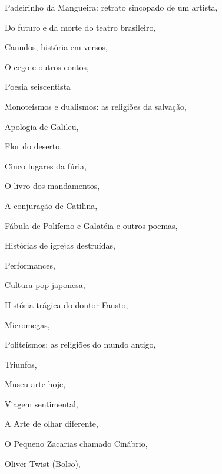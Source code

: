 \begin{multicols}{2}
\begin{enumerate}
{\item Padeirinho da Mangueira: retrato sincopado de um artista, {}
\item Do futuro e da morte do teatro brasileiro, {}
\item Canudos, história em versos, {}
\item O cego e outros contos, {}
\item Poesia seiscentista
\item Monoteísmos e dualismos: as religiões da salvação, {}
\item Apologia de Galileu, {}
\item Flor do deserto, {}
\item Cinco lugares da fúria, {}
\item O livro dos mandamentos, {}
\item A conjuração de Catilina, {}
\item Fábula de Polifemo e Galatéia e outros poemas, {}
\item Histórias de igrejas destruídas, {}
\item Performances, {}
\item Cultura pop japonesa, {}
\item História trágica do doutor Fausto, {}
\item Micromegas, {}
\item Politeísmos: as religiões do mundo antigo, {}
\item Triunfos, {}
\item Museu arte hoje, {}
\item Viagem sentimental, {}
\item A Arte de olhar diferente, {}
\item O Pequeno Zacarias chamado Cinábrio, {}
\item Oliver Twist (Bolso), {}
}
\end{enumerate}
\end{multicols}
